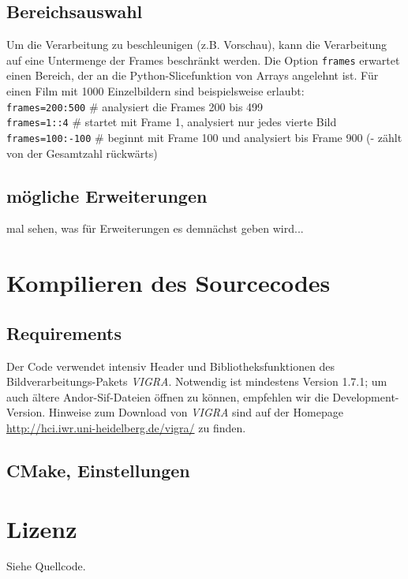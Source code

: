 \documentclass[DIV12,a4paper]{scrartcl}
\begin{document}
\subsection{Bereichsauswahl}
Um die Verarbeitung zu beschleunigen (z.B. Vorschau), kann die Verarbeitung auf 
eine Untermenge der Frames beschränkt werden. Die Option \texttt{frames} erwartet
einen Bereich, der an die Python-Slicefunktion von Arrays angelehnt ist. 
Für einen Film mit 1000 Einzelbildern sind beispielsweise erlaubt:\\
\texttt{frames=200:500} \# analysiert die Frames 200 bis 499\\
\texttt{frames=1::4} \# startet mit Frame 1, analysiert nur jedes vierte Bild\\
\texttt{frames=100:-100} \# beginnt mit Frame 100 und analysiert bis Frame 900 (- zählt von der Gesamtzahl rückwärts) %

\subsection{mögliche Erweiterungen}
mal sehen, was für Erweiterungen es demnächst geben wird...

\section{Kompilieren des Sourcecodes}
\label{sec:Kompilieren}
\subsection{Requirements}
Der Code verwendet intensiv Header und Bibliotheksfunktionen des Bildverarbeitungs-Pakets \emph{VIGRA}.
Notwendig ist mindestens Version 1.7.1; um auch ältere Andor-Sif-Dateien 
öffnen zu können, empfehlen wir die Development-Version. Hinweise zum Download 
von \emph{VIGRA} sind auf der Homepage \url{http://hci.iwr.uni-heidelberg.de/vigra/} zu finden.

\subsection{CMake, Einstellungen}

\section{Lizenz}
Siehe Quellcode.
\end{document}
